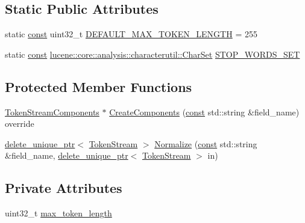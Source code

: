 \subsection*{Static Public Attributes}
\begin{DoxyCompactItemize}
\item 
static \mbox{\hyperlink{ZlibCrc32_8h_a2c212835823e3c54a8ab6d95c652660e}{const}} uint32\+\_\+t \mbox{\hyperlink{classlucene_1_1core_1_1analysis_1_1standard_1_1StandardAnalyzer_a3c01017747853f232cdceee30fea7a35}{D\+E\+F\+A\+U\+L\+T\+\_\+\+M\+A\+X\+\_\+\+T\+O\+K\+E\+N\+\_\+\+L\+E\+N\+G\+TH}} = 255
\item 
static \mbox{\hyperlink{ZlibCrc32_8h_a2c212835823e3c54a8ab6d95c652660e}{const}} \mbox{\hyperlink{classlucene_1_1core_1_1analysis_1_1characterutil_1_1CharSet}{lucene\+::core\+::analysis\+::characterutil\+::\+Char\+Set}} \mbox{\hyperlink{classlucene_1_1core_1_1analysis_1_1standard_1_1StandardAnalyzer_a43ca4db920b102be1fd2d7c2191fc69e}{S\+T\+O\+P\+\_\+\+W\+O\+R\+D\+S\+\_\+\+S\+ET}}
\end{DoxyCompactItemize}
\subsection*{Protected Member Functions}
\begin{DoxyCompactItemize}
\item 
\mbox{\hyperlink{classlucene_1_1core_1_1analysis_1_1TokenStreamComponents}{Token\+Stream\+Components}} $\ast$ \mbox{\hyperlink{classlucene_1_1core_1_1analysis_1_1standard_1_1StandardAnalyzer_a0d569e3e48f2060a4698481ec1b49d12}{Create\+Components}} (\mbox{\hyperlink{ZlibCrc32_8h_a2c212835823e3c54a8ab6d95c652660e}{const}} std\+::string \&field\+\_\+name) override
\item 
\mbox{\hyperlink{namespacelucene_1_1core_1_1analysis_a1ecb3e92b19c3afd8060d81a437a7a3b}{delete\+\_\+unique\+\_\+ptr}}$<$ \mbox{\hyperlink{classlucene_1_1core_1_1analysis_1_1TokenStream}{Token\+Stream}} $>$ \mbox{\hyperlink{classlucene_1_1core_1_1analysis_1_1standard_1_1StandardAnalyzer_aa42382c6504229a195abbc25f048a614}{Normalize}} (\mbox{\hyperlink{ZlibCrc32_8h_a2c212835823e3c54a8ab6d95c652660e}{const}} std\+::string \&field\+\_\+name, \mbox{\hyperlink{namespacelucene_1_1core_1_1analysis_a1ecb3e92b19c3afd8060d81a437a7a3b}{delete\+\_\+unique\+\_\+ptr}}$<$ \mbox{\hyperlink{classlucene_1_1core_1_1analysis_1_1TokenStream}{Token\+Stream}} $>$ in)
\end{DoxyCompactItemize}
\subsection*{Private Attributes}
\begin{DoxyCompactItemize}
\item 
uint32\+\_\+t \mbox{\hyperlink{classlucene_1_1core_1_1analysis_1_1standard_1_1StandardAnalyzer_a3f094c0fd3d5efa0c8982e7bee81bbef}{max\+\_\+token\+\_\+length}}
\end{DoxyCompactItemize}
